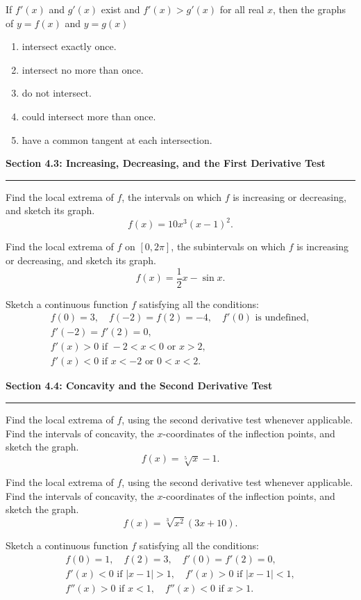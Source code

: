 \documentclass[11pt]{article}
\newcommand{\wsS}{\vspace*{2.0cm}}
\newcommand{\wsL}{\vspace*{5.0cm}}
\newcommand{\prob}[1]{\item[\textbf{#1}]}
\newcommand{\choices}[5]{\begin{enumerate}[label=\textbf{(\Alph*)},leftmargin=2.4em,itemsep=1pt,topsep=4pt]\item #1\item #2\item #3\item #4\item #5\end{enumerate}}
\newcommand{\topicdivider}[2]{%
  \Needspace{11.5cm}%
  \par\medskip
  \noindent\textbf{Section #1: #2}\par
  \vspace{0.25em}
  \noindent\rule{\linewidth}{0.6pt}\par
  \medskip
}
\begin{document}
\Needspace{5.5cm}
\begin{probs}
\prob{48.} If $f'(x)$ and $g'(x)$ exist and $f'(x)>g'(x)$ for all real $x$, then the graphs of $y=f(x)$ and $y=g(x)$\choices{intersect exactly once.}{intersect no more than once.}{do not intersect.}{could intersect more than once.}{have a common tangent at each intersection.} \wsS
\end{probs}
\topicdivider{4.3}{Increasing, Decreasing, and the First Derivative Test}
\Needspace{10cm}
\begin{probs}
\prob{49.} Find the local extrema of $f$, the intervals on which $f$ is increasing or decreasing, and sketch its graph.\[f(x)=10x^3(x-1)^2.\] \wsL
\end{probs}
\Needspace{10cm}
\begin{probs}
\prob{50.} Find the local extrema of $f$ on $[0,2\pi]$, the subintervals on which $f$ is increasing or decreasing, and sketch its graph.\[f(x)=\frac12x-\sin x.\] \wsL
\end{probs}
\Needspace{10cm}
\begin{probs}
\prob{51.} Sketch a continuous function $f$ satisfying all the conditions: \[\begin{gathered} f(0)=3,\quad f(-2)=f(2)=-4,\quad f'(0)\text{ is undefined},\\ f'(-2)=f'(2)=0,\\ f'(x)>0\text{ if }-2<x<0\text{ or }x>2,\\ f'(x)<0\text{ if }x<-2\text{ or }0<x<2. \end{gathered}\] \wsL
\end{probs}
\topicdivider{4.4}{Concavity and the Second Derivative Test}
\Needspace{10cm}
\begin{probs}
\prob{52.} Find the local extrema of $f$, using the second derivative test whenever applicable. Find the intervals of concavity, the $x$-coordinates of the inflection points, and sketch the graph.\[f(x)=\sqrt[5]{x}-1.\] \wsL
\end{probs}
\Needspace{10cm}
\begin{probs}
\prob{53.} Find the local extrema of $f$, using the second derivative test whenever applicable. Find the intervals of concavity, the $x$-coordinates of the inflection points, and sketch the graph.\[f(x)=\sqrt[3]{x^2}(3x+10).\] \wsL
\end{probs}
\Needspace{10cm}
\begin{probs}
\prob{54.} Sketch a continuous function $f$ satisfying all the conditions: \[\begin{gathered} f(0)=1,\quad f(2)=3,\quad f'(0)=f'(2)=0,\\ f'(x)<0\text{ if }|x-1|>1,\quad f'(x)>0\text{ if }|x-1|<1,\\ f''(x)>0\text{ if }x<1,\quad f''(x)<0\text{ if }x>1. \end{gathered}\] \wsL
\end{probs}
\end{document}
